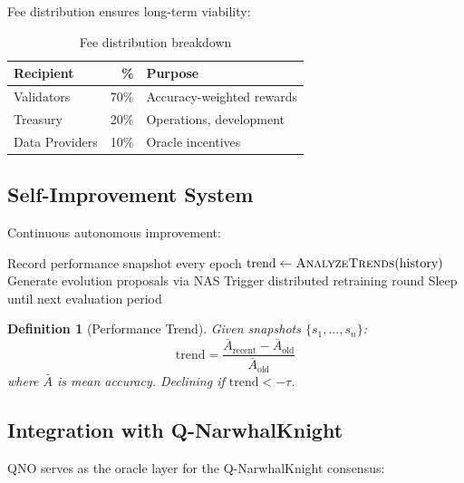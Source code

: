 \documentclass[11pt,a4paper]{article}
\newtheorem{definition}[theorem]{Definition}
\begin{document}
Fee distribution ensures long-term viability:

\begin{table}[h]
\centering
\begin{tabular}{lrl}
\toprule
\textbf{Recipient} & \textbf{\%} & \textbf{Purpose} \\
\midrule
Validators & 70\% & Accuracy-weighted rewards \\
Treasury & 20\% & Operations, development \\
Data Providers & 10\% & Oracle incentives \\
\bottomrule
\end{tabular}
\caption{Fee distribution breakdown}
\end{table}

\subsection{Self-Improvement System}

Continuous autonomous improvement:

\begin{algorithm}
\caption{Autonomous Self-Improvement Loop}
\begin{algorithmic}[1]
\Loop
    \State Record performance snapshot every epoch
    \State $\text{trend} \gets \textsc{AnalyzeTrends}(\text{history})$
            \State Generate evolution proposals via NAS
        \EndIf
            \State Trigger distributed retraining round
        \EndIf
    \EndIf
    \State Sleep until next evaluation period
\EndLoop
\end{algorithmic}
\end{algorithm}

\begin{definition}[Performance Trend]
Given snapshots $\{s_1, \ldots, s_n\}$:
\begin{equation}
\text{trend} = \frac{\bar{A}_{\text{recent}} - \bar{A}_{\text{old}}}{\bar{A}_{\text{old}}}
\end{equation}
where $\bar{A}$ is mean accuracy. Declining if $\text{trend} < -\tau$.
\end{definition}

\subsection{Integration with Q-NarwhalKnight}

QNO serves as the oracle layer for the Q-NarwhalKnight consensus:
\end{document}
